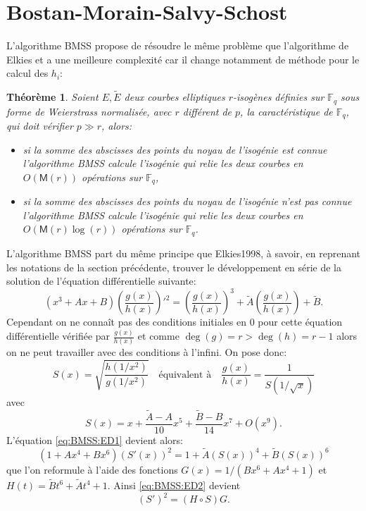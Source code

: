 \documentclass[10pt,a4paper]{book}
\theoremstyle{plain}
\newtheorem{thm}{Théorème}[chapter]
\theoremstyle{definition}
\theoremstyle{definition}
\theoremstyle{definition}
\theoremstyle{definition}
\theoremstyle{remark}
\theoremstyle{remark}
\theoremstyle{definition}
\begin{document}
\section{Bostan-Morain-Salvy-Schost}
L'algorithme BMSS \cite{BMSS08} propose de résoudre le même problème que 
l'algorithme de Elkies \cite{elkies1998} et a une meilleure complexité car 
il change notamment de méthode pour le calcul des $h_i$:
\begin{thm}
\label{thm:BMSS}
Soient $E, \tilde{E}$ deux courbes elliptiques $r$-isogènes définies sur 
$\mathbb{F}_q$ sous forme de Weierstrass normalisée, avec $r$ différent de 
$p$, la caractéristique de $\mathbb{F}_q$, qui doit vérifier 
$p \gg r$, alors:
\begin{itemize}
\item  si la somme des abscisses des points du noyau de l'isogénie est connue 
l'algorithme BMSS  calcule l'isogénie qui relie les deux courbes en 
$O(\mathsf{M}(r))$ opérations sur $\mathbb{F}_q$,
\item si la somme des abscisses des points du noyau de l'isogénie n'est pas 
connue l'algorithme BMSS calcule l'isogénie qui relie les 
deux courbes en $O(\mathsf{M}(r)\log(r))$ opérations sur $\mathbb{F}_q$.
\end{itemize}
\end{thm}

L'algorithme BMSS part du même principe que Elkies1998, à savoir, en reprenant 
les notations de la section précédente, trouver le développement en série de la
solution de l'équation différentielle suivante:   
\begin{equation}
\label{eq:BMSS:ED1}
(x^3+Ax+B)\left(\frac{g(x)}{h(x)} \right)'^2=  \left(\frac{g(x)}{h(x)} \right)^3 + \tilde{A} \left(\frac{g(x)}{h(x)} \right) + \tilde{B}.
\end{equation}
Cependant on ne connaît pas des conditions initiales en $0$ pour cette équation
différentielle vérifiée par $\frac{g(x)}{h(x)}$ et comme $\deg(g)=r> \deg(h)= 
r-1$ alors on ne peut travailler avec des conditions à l'infini. On pose donc:
\begin{equation}
S(x)=\sqrt{\frac{h(1/x^2)}{g(1/x^2)}} \quad \text{équivalent à} \quad \frac{g(x)}{h(x)}=\frac{1}{S(1/\sqrt{x})}
\end{equation} 
avec 
\begin{equation}
S(x)=x + \frac{\tilde{A}-A}{10}x^5+\frac{\tilde{B}-B}{14}x^7+O(x^9).
\end{equation}
L'équation \eqref{eq:BMSS:ED1} devient alors:
\begin{equation}
\label{eq:BMSS:ED2}
(1+Ax^4+Bx^6)(S'(x))^2=1+\tilde{A}(S(x))^4+\tilde{B}(S(x))^6
\end{equation}
que l'on reformule à l'aide des fonctions $G(x)=1/(Bx^6+Ax^4+1)$ et $H(t)=\tilde{B}t^6+\tilde{A}t^4+1$. Ainsi \eqref{eq:BMSS:ED2} devient 
\begin{equation}
\label{eq:BMSS:ED3}
(S')^2=(H \circ S) G.
\end{equation}
\end{document}

